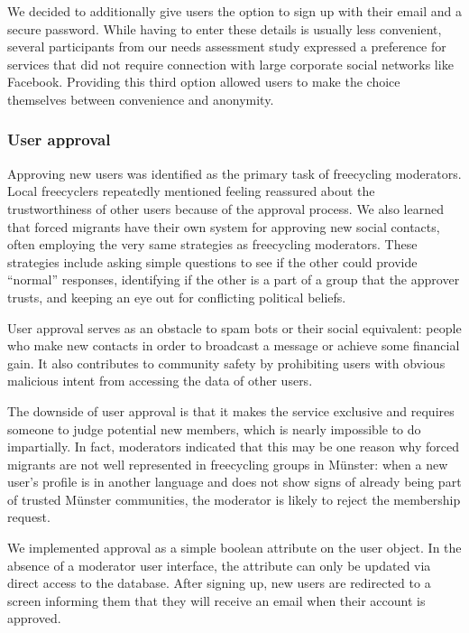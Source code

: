 We decided to additionally give users the option to sign up with their email and a secure password. While having to enter these details is usually less convenient, several participants from our needs assessment study expressed a preference for services that did not require connection with large corporate social networks like Facebook. Providing this third option allowed users to make the choice themselves between convenience and anonymity.

\subsubsection*{User approval}

Approving new users was identified as the primary task of freecycling moderators. Local freecyclers repeatedly mentioned feeling reassured about the trustworthiness of other users because of the approval process. We also learned that forced migrants have their own system for approving new social contacts, often employing the very same strategies as freecycling moderators. These strategies include asking simple questions to see if the other could provide ``normal'' responses, identifying if the other is a part of a group that the approver trusts, and keeping an eye out for conflicting political beliefs.

User approval serves as an obstacle to spam bots or their social equivalent: people who make new contacts in order to broadcast a message or achieve some financial gain. It also contributes to community safety by prohibiting users with obvious malicious intent from accessing the data of other users.

The downside of user approval is that it makes the service exclusive and requires someone to judge potential new members, which is nearly impossible to do impartially. In fact, moderators indicated that this may be one reason why forced migrants are not well represented in freecycling groups in Münster: when a new user's profile is in another language and does not show signs of already being part of trusted Münster communities, the moderator is likely to reject the membership request.

We implemented approval as a simple boolean attribute on the user object. In the absence of a moderator user interface, the attribute can only be updated via direct access to the database. After signing up, new users are redirected to a screen informing them that they will receive an email when their account is approved.

